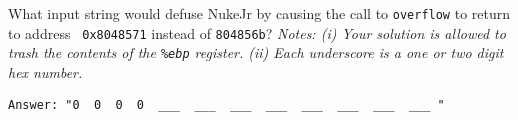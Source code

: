 \begin{problem}{10}
\begin{choice}
\item What input string would defuse NukeJr by causing 
the call to {\tt overflow} to return to address {\tt
0x8048571} instead of {\tt 804856b}?  
{\em Notes: (i) Your solution is allowed to trash the contents of 
the {\tt \%ebp} register. (ii) Each underscore is a one or two
digit hex number.}


\begin{verbatim}
Answer: "0  0  0  0  ___  ___  ___  ___  ___  ___  ___  ___ "
\end{verbatim}


\end{choice}

\end{problem}




